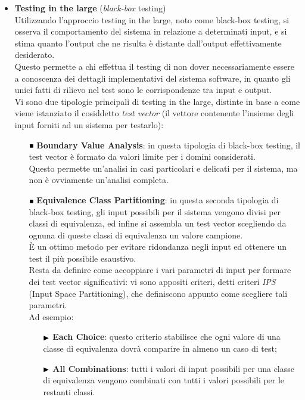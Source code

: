 \begin{itemize}
\item \textbf{Testing in the large} (\emph{black-box} testing)\\
Utilizzando l'approccio testing in the large, noto come black-box testing, si osserva il comportamento del sistema in relazione a determinati input, e si stima quanto l'output che ne risulta è distante dall'output effettivamente desiderato. \\
Questo permette a chi effettua il testing di non dover necessariamente essere a conoscenza dei dettagli implementativi del sistema software, in quanto gli unici fatti di rilievo nel test sono le corrispondenze tra input e output.\\
Vi sono due tipologie principali di testing in the large, distinte in base a come viene istanziato il cosiddetto \emph{test vector} (il vettore contenente l'insieme degli input forniti ad un sistema per testarlo):

\begin{itemize}
\item [$ \Blacksquare $] \textbf{Boundary Value Analysis}: in questa tipologia di black-box testing, il test vector è formato da valori limite per i domini considerati. \\
Questo permette un'analisi in casi particolari e delicati per il sistema, ma non è ovviamente un'analisi completa.\\
\item [$ \Blacksquare $] \textbf{Equivalence Class Partitioning}: in questa seconda tipologia di black-box testing, gli input possibili per il sistema vengono divisi per classi di equivalenza, ed infine si assembla un test vector scegliendo da ognuna di queste classi di equivalenza un valore campione.\\
È un ottimo metodo per evitare ridondanza negli input ed ottenere un test il più possibile esaustivo.\\
Resta da definire come accoppiare i vari parametri di input per formare dei test vector significativi: vi sono appositi criteri, detti criteri \emph{IPS} (Input Space Partitioning), che definiscono appunto come scegliere tali parametri. \\
Ad esempio:\\

\begin{itemize}
\item [$ \Blacktriangleright $] \textbf{Each Choice}: questo criterio stabilisce che ogni valore di una classe di equivalenza dovrà comparire in almeno un caso di test;
\item [$ \Blacktriangleright $] \textbf{All Combinations}: tutti i valori di input possibili per una classe di equivalenza vengono combinati con tutti i valori possibili per le restanti classi.\\
\end{itemize}
	

\end{itemize}
\end{itemize}
